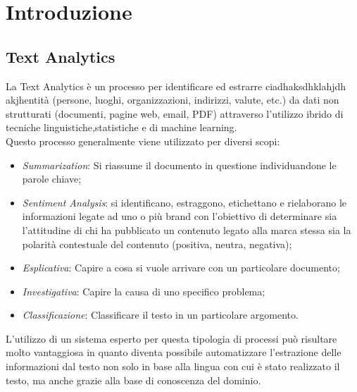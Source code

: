 \section{Introduzione}

\subsection{Text Analytics}
\nocite{wiki:textMining}
\nocite{gartner:textAnalytics}
\nocite{expertsystem:textAnalytics}
La Text Analytics è un processo per identificare ed estrarre  ciadhaksdhklahjdh akjhentità (persone, luoghi, organizzazioni, indirizzi, valute, etc.) da dati non strutturati (documenti, pagine web, email, PDF) attraverso l'utilizzo ibrido di tecniche linguistiche,statistiche e di machine learning. 
$$ $$
Questo processo generalmente viene utilizzato per diversi scopi:
\begin{itemize}
	\item \emph{Summarization}: Si riassume il documento in questione individuandone le parole chiave;
	\item \emph{Sentiment Analysis}: si identificano, estraggono, etichettano e rielaborano le informazioni legate ad uno o più brand con l'obiettivo di determinare sia l'attitudine di chi ha pubblicato un contenuto legato alla marca stessa sia la polarità contestuale del contenuto (positiva, neutra, negativa);
	\item \emph{Esplicativa}: Capire a cosa si vuole arrivare con un particolare documento;
	\item \emph{Investigativa}: Capire la causa di uno specifico problema;
	\item \emph{Classificazione}: Classificare il testo in un particolare argomento.
\end{itemize}

L'utilizzo di un sistema esperto per questa tipologia di processi può risultare molto vantaggiosa in quanto diventa possibile automatizzare l'estrazione delle informazioni dal testo non solo in base alla lingua con cui è stato realizzato il testo, ma anche grazie alla base di conoscenza del dominio.


